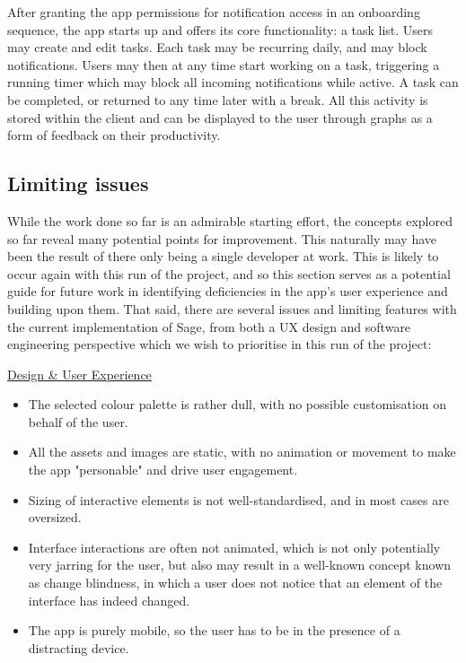 After granting the app permissions for notification access in an onboarding sequence, the app starts up and offers its core functionality: a task list. Users may create and edit tasks. Each task may be recurring daily, and may block notifications. Users may then at any time start working on a task, triggering a running timer which may block all incoming notifications while active. A task can be completed, or returned to any time later with a break. All this activity is stored within the client and can be displayed to the user through graphs as a form of feedback on their productivity.

\subsection{Limiting issues}
While the work done so far is an admirable starting effort, the concepts explored so far reveal many potential points for improvement. This naturally may have been the result of there only being a single developer at work. This is likely to occur again with this run of the project, and so this section serves as a potential guide for future work in identifying deficiencies in the app's user experience and building upon them. That said, there are several issues and limiting features with the current implementation of Sage, from both a UX design and software engineering perspective which we wish to prioritise in this run of the project:

\underline{Design \& User Experience}
\begin{itemize}
    \item The selected colour palette is rather dull, with no possible customisation on behalf of the user.
    \item All the assets and images are static, with no animation or movement to make the app "personable" and drive user engagement.
    \item Sizing of interactive elements is not well-standardised, and in most cases are oversized.
    \item Interface interactions are often not animated, which is not only potentially very jarring for the user, but also may result in a well-known concept known as change blindness, in which a user does not notice that an element of the interface has indeed changed.
    \item The app is purely mobile, so the user has to be in the presence of a distracting device.
\end{itemize}

